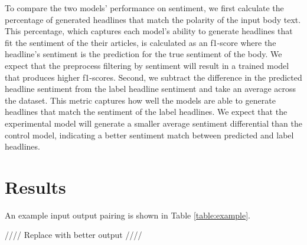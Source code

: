 \documentclass[11pt]{article}
\begin{document}
To compare the two models' performance on sentiment, we first calculate the percentage of generated headlines that match the polarity of the input body text. This percentage, which captures each model's ability to generate headlines that fit the sentiment of the their articles, is calculated as an f1-score where the headline's sentiment is the prediction for the true sentiment of the body. We expect that the preprocess filtering by sentiment will result in a trained model that produces higher f1-scores. Second, we subtract the difference in the predicted headline sentiment from the label headline sentiment and take an average across the dataset. This metric captures how well the models are able to generate headlines that match the sentiment of the label headlines. We expect that the experimental model will generate a smaller average sentiment differential than the control model, indicating a better sentiment match between predicted and label headlines.  

\section{Results}

An example input output pairing is shown in Table \ref{table:example}.

//// Replace with better output ////
\end{document}
